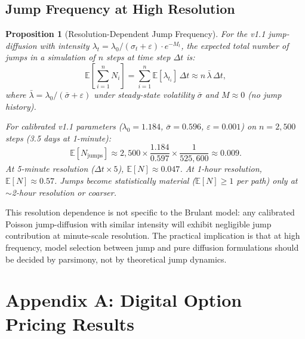 \documentclass[11pt,a4paper]{article}
\newtheorem{proposition}[theorem]{Proposition}
\newcommand{\E}{\mathbb{E}}
\begin{document}
\subsection{Jump Frequency at High Resolution}
\label{sec:jump_frequency}

\begin{proposition}[Resolution-Dependent Jump Frequency]
\label{prop:jump_freq}
For the v1.1 jump-diffusion with intensity
$\lambda_t = \lambda_0 / (\sigma_t + \varepsilon) \cdot e^{-M_t}$,
the expected total number of jumps in a simulation of $n$ steps at
time step $\Delta t$ is:
\[
  \E\!\left[\sum_{i=1}^{n} N_i\right]
  = \sum_{i=1}^{n} \E[\lambda_{t_i}]\,\Delta t
  \approx n\,\bar{\lambda}\,\Delta t,
\]
where $\bar{\lambda} = \lambda_0 / (\bar{\sigma} + \varepsilon)$ under
steady-state volatility $\bar{\sigma}$ and $M \approx 0$ (no jump history).

For calibrated v1.1 parameters ($\lambda_0 = 1.184$, $\bar{\sigma} = 0.596$,
$\varepsilon = 0.001$) on $n = 2{,}500$ steps (3.5 days at 1-minute):
\[
  \E[N_{\text{jumps}}] \approx 2{,}500 \times \frac{1.184}{0.597}
    \times \frac{1}{525{,}600} \approx 0.009.
\]
At 5-minute resolution ($\Delta t \times 5$), $\E[N] \approx 0.047$.
At 1-hour resolution, $\E[N] \approx 0.57$. Jumps become statistically
material ($\E[N] \geq 1$ per path) only at $\sim$2-hour resolution or coarser.
\end{proposition}

This resolution dependence is not specific to the Brulant model: any
calibrated Poisson jump-diffusion with similar intensity will exhibit
negligible jump contribution at minute-scale resolution. The practical
implication is that at high frequency, model selection between jump and
pure diffusion formulations should be decided by parsimony, not by
theoretical jump dynamics.


\section*{Appendix A: Digital Option Pricing Results}
\label{sec:appendix_pricing}

\end{document}
